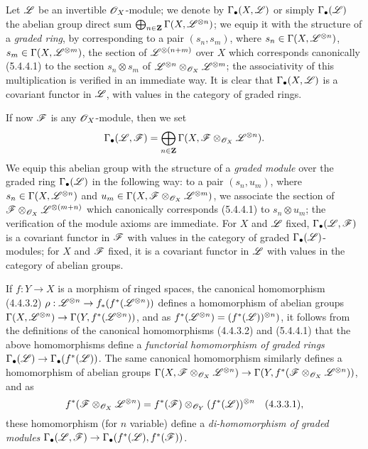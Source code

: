 \begin{env}[5.4.6]
\label{0.5.4.6}
Let $\mathscr{L}$ be an invertible $\mathscr{O}_X$-module; we denote by $\Gamma_\bullet(X,\mathscr{L})$ or simply $\Gamma_\bullet(\mathscr{L})$ the abelian group direct sum $\bigoplus_{n\in\mathbf{Z}}\Gamma(X,\mathscr{L}^{\otimes n})$;
we equip it with the structure of a \emph{graded ring}, by corresponding to a pair $(s_n,s_m)$, where $s_n\in\Gamma(X,\mathscr{L}^{\otimes n})$, $s_m\in\Gamma(X,\mathscr{L}^{\otimes m})$, the section of $\mathscr{L}^{\otimes(n+m)}$ over $X$ which corresponds canonically (5.4.4.1) to the section $s_n\otimes s_m$ of $\mathscr{L}^{\otimes n}\otimes_{\mathscr{O}_X}\mathscr{L}^{\otimes m}$;
the associativity of this multiplication is verified in an immediate way.
It is clear that $\Gamma_\bullet(X,\mathscr{L})$ is a covariant functor in $\mathscr{L}$, with values in the category of graded rings.

If now $\mathscr{F}$ is any $\mathscr{O}_X$-module, then we set
\[
  \Gamma_\bullet(\mathscr{L},\mathscr{F})=\bigoplus_{n\in\mathbf{Z}}\Gamma(X,\mathscr{F}\otimes_{\mathscr{O}_X}\mathscr{L}^{\otimes n}).
\]
We equip this abelian group with the structure of a \emph{graded module} over the graded ring $\Gamma_\bullet(\mathscr{L})$ in the following way:
to a pair $(s_n,u_m)$, where $s_n\in\Gamma(X,\mathscr{L}^{\otimes n})$ and $u_m\in\Gamma(X,\mathscr{F}\otimes_{\mathscr{O}_X}\mathscr{L}^{\otimes m})$, we associate the section of $\mathscr{F}\otimes_{\mathscr{O}_X}\mathscr{L}^{\otimes(m+n)}$ which canonically corresponds (5.4.4.1) to $s_n\otimes u_m$;
the verification of the module axioms are immediate.
For $X$ and $\mathscr{L}$ fixed, $\Gamma_\bullet(\mathscr{L},\mathscr{F})$ is a covariant functor in $\mathscr{F}$ with values in the category of graded $\Gamma_\bullet(\mathscr{L})$-modules;
for $X$ and $\mathscr{F}$ fixed, it is a covariant functor in $\mathscr{L}$ with values in the category of abelian groups.

If $f:Y\to X$ is a morphism of ringed spaces, the canonical homomorphism (4.4.3.2) $\rho:\sh{L}^{\otimes n}\to f_*(f^*(\sh{L}^{\otimes n}))$ defines a homomorphism of abelian groups $\Gamma(X,\sh{L}^{\otimes n})\to\Gamma(Y,f^*(\sh{L}^{\otimes n}))$, and as $f^*(\mathscr{L}^{\otimes n})=(f^*(\mathscr{L}))^{\otimes n})$, it follows from the definitions of the canonical homomorphisms (4.4.3.2) and (5.4.4.1) that the above homomorphisms define a \emph{functorial homomorphism of graded rings $\Gamma_\bullet(\sh{L})\to\Gamma_\bullet(f^*(\sh{L}))$}.
The same canonical homomorphism  similarly defines a homomorphism of abelian groups $\Gamma(X,\sh{F}\otimes_{\sh{O}_X}\sh{L}^{\otimes n})\to\Gamma(Y,f^*(\sh{F}\otimes_{\sh{O}_X}\sh{L}^{\otimes n}))$, and as
\[
  f^*(\mathscr{F}\otimes_{\mathscr{O}_X}\mathscr{L}^{\otimes n})=f^*(\mathscr{F})\otimes_{\mathscr{O}_Y}(f^*(\mathscr{L}))^{\otimes n}
  \quad(4.3.3.1),
\]
these homomorphism (for $n$ variable) define a \emph{di-homomorphism of graded modules $\Gamma_\bullet(\sh{L},\sh{F})\to\Gamma_\bullet(f^*(\sh{L}),f^*(\sh{F}))$}.
\end{env}


